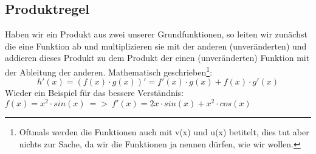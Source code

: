 \subsection{Produktregel}
Haben wir ein Produkt aus zwei unserer Grundfunktionen, so leiten wir zunächst die eine Funktion ab und multiplizieren sie mit der anderen (unveränderten) und addieren dieses Produkt zu dem Produkt der einen (unveränderten) Funktion mit der Ableitung der anderen. Mathematisch geschrieben\footnote{Oftmals werden die Funktionen auch mit v(x) und u(x) betitelt, dies tut aber nichts zur Sache, da wir die Funktionen ja nennen dürfen, wie wir wollen.}:
\[h'(x)=(f(x)\cdot g(x))' = f'(x)\cdot g(x)+f(x)\cdot g'(x)\]
Wieder ein Beispiel für das bessere Verständnis: \(f(x)=x^2\cdot sin(x)\ =>\ f'(x)=2x\cdot sin(x)+x^2\cdot cos(x)\)
